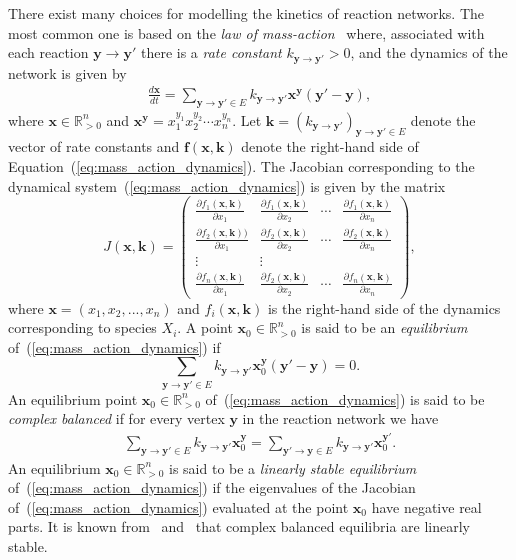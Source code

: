 \documentclass[11pt]{article}
\theoremstyle{plain}
\theoremstyle{definition}
\theoremstyle{remark}
\newcommand\f{\boldsymbol{f}}
\newcommand\bk{\boldsymbol{k}}
\newcommand\x{\boldsymbol{x}}
\newcommand\y{\boldsymbol{y}}
\newcommand\by{\boldsymbol{y}}
\begin{document}
There exist many choices for modelling the kinetics of reaction networks. The most common one is based on the \emph{law of mass-action}~\cite{voit2015150,guldberg1864studies,yu2018mathematical,gunawardena2003chemical,feinberg1979lectures} where, associated with each reaction $\by\rightarrow\by'$ there is a {\em rate constant} $k_{\by\rightarrow\by'}>0$, and the dynamics of the network is given by
\begin{eqnarray}\label{eq:mass_action_dynamics}
\frac{d\x}{dt}=\displaystyle\sum_{\by \to \by'\in E} k_{\by\rightarrow \by'}\x^{\by}(\by'-\by),
\end{eqnarray}
%
where $\x\in\mathbb{R}^n_{>0}$ and $\x^{\y}=x_1^{y_1}x_2^{y_2}\cdots x_n^{y_n}$. Let $\bk=(k_{\by\rightarrow\by'})_{\by\rightarrow\by'\in E}$ denote the vector of rate constants and $\f(\x,\bk)$ denote the right-hand side of Equation~(\ref{eq:mass_action_dynamics}). The Jacobian corresponding to the dynamical system~(\ref{eq:mass_action_dynamics}) is given by the matrix
$$J(\x,\bk)=
\begin{pmatrix} 
\frac{\partial f_1(\x,\bk)}{\partial x_1} &  \frac{\partial f_1(\x,\bk)}{\partial x_2} & \cdots &  \frac{\partial f_1(\x,\bk)}{\partial x_n} \\
\frac{\partial f_2(\x,\bk))}{\partial x_1} &  \frac{\partial f_2(\x,\bk)}{\partial x_2} & \cdots &  \frac{\partial f_2(\x,\bk)}{\partial x_n} \\
\vdots  & \vdots   \\
\frac{\partial f_n(\x,\bk)}{\partial x_1} &  \frac{\partial f_2(\x,\bk)}{\partial x_2} & \cdots &  \frac{\partial f_n(\x,\bk)}{\partial x_n} 
\end{pmatrix},
$$
where $\x=(x_1,x_2,...,x_n)$ and $f_i(\x,\bk)$ is the right-hand side of the dynamics corresponding to species $X_i$. A point $\x_0\in\mathbb{R}^n_{>0}$ is said to be an {\em equilibrium} of~(\ref{eq:mass_action_dynamics}) if $$\displaystyle\sum_{\by \to \by'\in E} k_{\by\rightarrow \by'}\x_0^{\by}(\by'-\by)=0.$$ 
An equilibrium point $\x_0\in\mathbb{R}^n_{>0}$ of~(\ref{eq:mass_action_dynamics}) is said to be \emph{complex balanced} if for every vertex $\by$ in the reaction network we have
\begin{eqnarray}
\displaystyle\sum_{\by \to \by'\in E} k_{\by\rightarrow \by'}\x_0^{\by} = \displaystyle\sum_{\by' \to \by\in E} k_{\by\rightarrow \by'}\x_0^{\by'}.
\end{eqnarray}
%
An equilibrium $\x_0\in\mathbb{R}^n_{>0}$ is said to be a \emph{linearly stable equilibrium} of~(\ref{eq:mass_action_dynamics}) if the eigenvalues of the Jacobian of~(\ref{eq:mass_action_dynamics}) evaluated at the point $\x_0$ have negative real parts. It is known from~\cite[Theorem 5.2]{siegel2008linearization} and~\cite[15.2.2]{feinberg2019foundations} that complex balanced equilibria are linearly stable.
\end{document}
